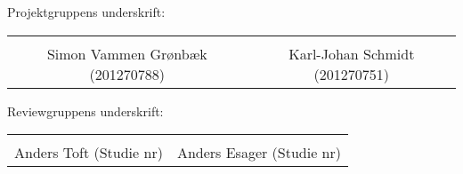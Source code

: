 Projektgruppens underskrift: 
\begin{table}[H]
	\centering
	\begin{tabular}{c c}
		\underline{\phantom{mmmmmmmmmmmmmmmmmmmmm}} & \underline{\phantom{mmmmmmmmmmmmmmmmmmmmm}} \\
		Simon Vammen Grønbæk (201270788) \vspace{2cm} & Karl-Johan Schmidt (201270751) \vspace{2cm}\\
	\end{tabular}
\end{table}
Reviewgruppens underskrift:
\begin{table}[H]
	\centering
	\begin{tabular}{c c}
		\underline{\phantom{mmmmmmmmmmmmmmmmmmmmm}} & \underline{\phantom{mmmmmmmmmmmmmmmmmmmmm}} \\
		Anders Toft (Studie nr) \vspace{2cm} & Anders Esager (Studie nr) \vspace{2cm}\\
	\end{tabular}
\end{table}
